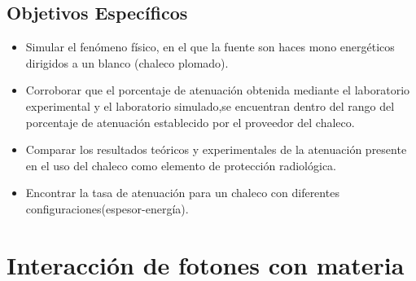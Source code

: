 \documentclass[12pt,fleqn]{book} %
\numberwithin{equation}{section} %
\numberwithin{figure}{section} %
\numberwithin{table}{section} %
\begin{document}
\section{Objetivos Específicos}
\begin{itemize}

\item Simular el fenómeno físico, en el que la fuente son haces mono energéticos dirigidos a un blanco (chaleco plomado).   

\item Corroborar que el porcentaje de atenuación obtenida mediante el laboratorio experimental y el laboratorio simulado,se encuentran dentro del rango del porcentaje de atenuación establecido por  el proveedor del chaleco.   

\item Comparar los resultados teóricos y experimentales de la atenuación presente en el uso del chaleco como elemento de protección radiológica. 
\item Encontrar la tasa de atenuación para un chaleco con diferentes configuraciones(espesor-energía).

\end{itemize}

\chapter{Interacción de fotones con materia}

\end{document}
